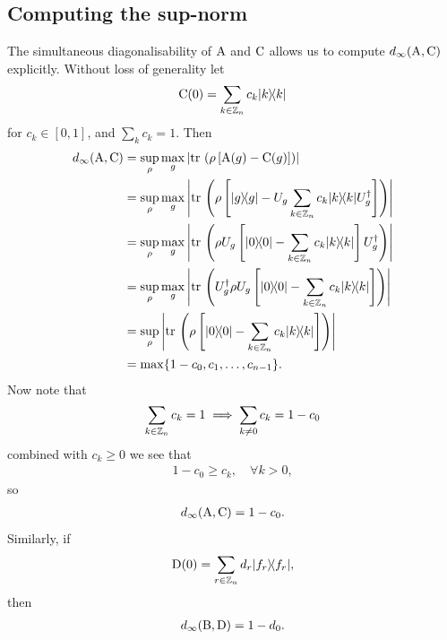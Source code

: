 \subsection{Computing the sup-norm}
The simultaneous diagonalisability of $\operatorname{A}$ and $\operatorname{C}$ allows us to compute $d_\infty(\operatorname{A},\operatorname{C})$ explicitly. Without loss of generality let
\begin{align}
  \opc(0) = \sum_{k\in\cyc[n]} c_k \ketbra{k}{k}
\end{align}
for $c_k\in \left[0,1\right]$, and $\sum_k c_k = 1$. Then
\begin{align}
  d_\infty(\opa,\opc) &= \sup_\rho \max_{g} \abs{\tr{\rho\left[\opa(g) - \opc(g)\right]}} \\
                      &=  \sup_\rho \max_g \abs{\tr{\rho\left[\ketbra{g}{g} - U_g\sum_{k\in\cyc[n]}c_k\ketbra{k}{k} U_g^\dagger\right]}} \\
                      &=  \sup_\rho \max_g \abs{\tr{\rho U_g\left[\ketbra{0}{0} - \sum_{k\in\cyc[n]}c_k\ketbra{k}{k} \right]U_g^\dagger}} \\
                      &=  \sup_\rho \max_g \abs{\tr{U_g^\dagger \rho U_g\left[\ketbra{0}{0} - \sum_{k\in\cyc[n]}c_k\ketbra{k}{k} \right]}} \\
                      &=  \sup_\rho \abs{\tr{\rho \left[\ketbra{0}{0} - \sum_{k\in\cyc[n]}c_k\ketbra{k}{k} \right]}} \\
                      &=  \max\{1-c_0, c_1, \hdots, c_{n-1}\}.
\end{align}
Now note that
\begin{align}
  \sum_{k\in\cyc[n]} c_k = 1 \implies \sum_{k\neq 0} c_k = 1-c_0
\end{align}
combined with $c_k \geq 0$ we see that
\begin{align}
  1-c_0 \geq c_k, \quad \forall k > 0,
\end{align}
so
\begin{align}
  \label{eqn:comp-constraint}
  d_\infty(\operatorname{A},\operatorname{C}) = 1-c_0.
\end{align}
Similarly, if
\begin{align}
  \opd(0) = \sum_{r\in\cyc[n]} d_r \ketbra{f_r}{f_r},
\end{align}
then
\begin{align}
  \label{eqn:four-constraint}
  d_\infty(\operatorname{B},\operatorname{D}) = 1-d_0.
\end{align}
